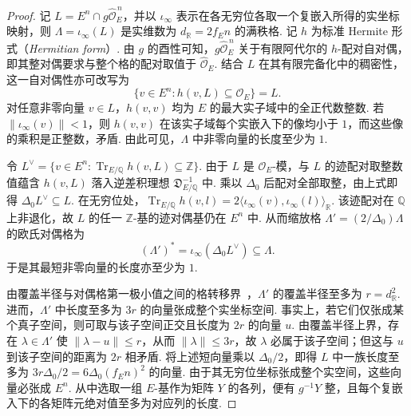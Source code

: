 \begin{proof}
记 $L=E^n\cap g\widehat{\mathcal O}_E^{\,n}$，并以 $\iota_\infty$ 表示在各无穷位各取一个复嵌入所得的实坐标映射，则 $\Lambda=\iota_\infty(L)$ 是实维数为 $d_{\mathbb R}=2f_E n$ 的满秩格. 记 $h$ 为标准 Hermite 形式（\emph{Hermitian form}）. 由 $g$ 的酉性可知，$g\widehat{\mathcal O}_E^{\,n}$ 关于有限阿代尔的 $h$-配对自对偶，即其整对偶要求与整个格的配对取值于 $\widehat{\mathcal O}_E$. 结合 $L$ 在其有限完备化中的稠密性，这一自对偶性亦可改写为
\[
 \{v\in E^n:h(v,L)\subseteq\mathcal O_E\}=L.
\]
对任意非零向量 $v\in L$，$h(v,v)$ 均为 $E$ 的最大实子域中的全正代数整数. 若 $\|\iota_\infty(v)\|<1$，则 $h(v,v)$ 在该实子域每个实嵌入下的像均小于 $1$，而这些像的乘积是正整数，矛盾. 由此可见，$\Lambda$ 中非零向量的长度至少为 $1$.

令 $L^\vee=\{v\in E^n:\operatorname{Tr}_{E/\mathbb Q}h(v,L)\subseteq\mathbb Z\}$. 由于 $L$ 是 $\mathcal O_E$-模，与 $L$ 的迹配对取整数值蕴含 $h(v,L)$ 落入逆差积理想 $\mathfrak D_{E/\mathbb Q}^{-1}$ 中. 乘以 $\Delta_0$ 后配对全部取整，由上式即得 $\Delta_0 L^\vee\subseteq L$. 在无穷位处，$\operatorname{Tr}_{E/\mathbb Q}h(v,l)=2\langle\iota_\infty(v),\iota_\infty(l)\rangle_{\mathbb R}$. 该迹配对在 $\mathbb Q$ 上非退化，故 $L$ 的任一 $\mathbb Z$-基的迹对偶基仍在 $E^n$ 中. 从而缩放格 $\Lambda'=(2/\Delta_0)\Lambda$ 的欧氏对偶格为
\[
 (\Lambda')^*=\iota_\infty(\Delta_0 L^\vee)\subseteq \Lambda.
\]
于是其最短非零向量的长度亦至少为 $1$.

由覆盖半径与对偶格第一极小值之间的格转移界~\cite{LLS1990}，$\Lambda'$ 的覆盖半径至多为 $r=d_{\mathbb R}^2$. 进而，$\Lambda'$ 中长度至多为 $3r$ 的向量张成整个实坐标空间. 事实上，若它们仅张成某个真子空间，则可取与该子空间正交且长度为 $2r$ 的向量 $u$. 由覆盖半径上界，存在 $\lambda\in\Lambda'$ 使 $\|\lambda-u\|\le r$，从而 $\|\lambda\|\le3r$，故 $\lambda$ 必属于该子空间；但这与 $u$ 到该子空间的距离为 $2r$ 相矛盾. 将上述短向量乘以 $\Delta_0/2$，即得 $L$ 中一族长度至多为 $3r\Delta_0/2=6\Delta_0(f_E n)^2$ 的向量. 由于其无穷位坐标张成整个实空间，这些向量必张成 $E^n$. 从中选取一组 $E$-基作为矩阵 $Y$ 的各列，便有 $g^{-1}Y$ 整，且每个复嵌入下的各矩阵元绝对值至多为对应列的长度.
\end{proof}

